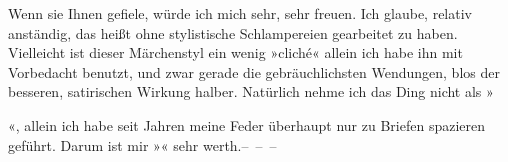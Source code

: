 \pstart
           Wenn sie Ihnen gefiele, würde ich mich sehr, sehr freuen. Ich glaube, relativ
               anständig, das heißt ohne stylistische Schlampereien gearbeitet zu haben. Vielleicht
               ist dieser Märchenstyl ein wenig »cliché« allein ich habe ihn mit Vorbedacht benutzt,
               und zwar gerade die gebräuchlichsten Wendungen, blos  der besseren, satirischen Wirkung halber. Natürlich nehme ich das Ding nicht als »\begin{otherlanguage}{french}\label{K_L03716-1v}\label{K_L03716-1}\end{otherlanguage}«, allein ich habe seit  Jahren meine
               Feder überhaupt nur zu Briefen spazieren geführt. Darum ist mir »\label{K_L03716-2v}\label{K_L03716-2}« sehr werth.– – –\pend
           
